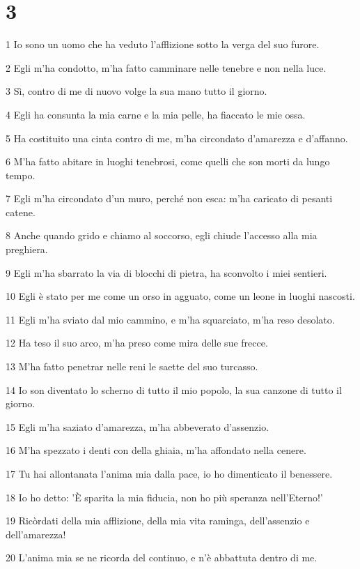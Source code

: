 \chapter{3}

\par 1 Io sono un uomo che ha veduto l'afflizione sotto la verga del suo furore.
\par 2 Egli m'ha condotto, m'ha fatto camminare nelle tenebre e non nella luce.
\par 3 Sì, contro di me di nuovo volge la sua mano tutto il giorno.
\par 4 Egli ha consunta la mia carne e la mia pelle, ha fiaccato le mie ossa.
\par 5 Ha costituito una cinta contro di me, m'ha circondato d'amarezza e d'affanno.
\par 6 M'ha fatto abitare in luoghi tenebrosi, come quelli che son morti da lungo tempo.
\par 7 Egli m'ha circondato d'un muro, perché non esca: m'ha caricato di pesanti catene.
\par 8 Anche quando grido e chiamo al soccorso, egli chiude l'accesso alla mia preghiera.
\par 9 Egli m'ha sbarrato la via di blocchi di pietra, ha sconvolto i miei sentieri.
\par 10 Egli è stato per me come un orso in agguato, come un leone in luoghi nascosti.
\par 11 Egli m'ha sviato dal mio cammino, e m'ha squarciato, m'ha reso desolato.
\par 12 Ha teso il suo arco, m'ha preso come mira delle sue frecce.
\par 13 M'ha fatto penetrar nelle reni le saette del suo turcasso.
\par 14 Io son diventato lo scherno di tutto il mio popolo, la sua canzone di tutto il giorno.
\par 15 Egli m'ha saziato d'amarezza, m'ha abbeverato d'assenzio.
\par 16 M'ha spezzato i denti con della ghiaia, m'ha affondato nella cenere.
\par 17 Tu hai allontanata l'anima mia dalla pace, io ho dimenticato il benessere.
\par 18 Io ho detto: 'È sparita la mia fiducia, non ho più speranza nell'Eterno!'
\par 19 Ricòrdati della mia afflizione, della mia vita raminga, dell'assenzio e dell'amarezza!
\par 20 L'anima mia se ne ricorda del continuo, e n'è abbattuta dentro di me.
